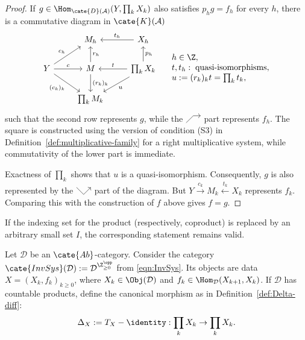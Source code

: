 \begin{proof}
	If $g\in\Hom_{\cate{D}(\mathcal{A})}(Y,\prod_kX_k)$ also satisfies
	$p_hg=f_h$ for every $h$, there is a commutative diagram in
	$\cate{K}(\mathcal{A})$
	\[\begin{tikzcd}
		& M_h & X_h \arrow[l, "t_h"'] \\
		Y \arrow[r, "c"] \arrow[ru, "c_h"] \arrow[rd, "{(c_k)_k}"'] & M \arrow[u, "r_h"'] \arrow[d, "(r_k)_k"] & \prod_k X_k \arrow[l, "t"'] \arrow[u, "p_h"'] \arrow[ld, "u"] \\
		& \prod_k M_k &
	\end{tikzcd} \quad \begin{array}{l}
		h \in \Z, \\
		t, t_h:\;\text{quasi-isomorphisms}, \\
		u := (r_k)_k t = \prod_k t_k ,
	\end{array}\]
	such that the second row represents $g$, while the
	$\begin{tikzpicture}[xscale=0.3, yscale=0.3, baseline=(O)]
		\coordinate (O) at (0, -0.8);
		\draw[->] (0,-1) -- (1, 0) -- (2, 0);
	\end{tikzpicture}$
	part represents $f_h$. The square is constructed using the version of
	condition (S3) in Definition~\ref{def:multiplicative-family} for a right
	multiplicative system, while commutativity of the lower part is immediate.

	Exactness of $\prod_k$ shows that $u$ is a quasi-isomorphism. Consequently,
	$g$ is also represented by the
	$\begin{tikzpicture}[xscale=0.3, yscale=0.3, baseline=(O)]
		\coordinate (O) at (0, -0.8);
		\draw[->] (0,0) -- (1, -1) -- (2, 0);
	\end{tikzpicture}$
	part of the diagram. But $Y\xrightarrow{c_k}M_k\xleftarrow{t_k}X_k$
	represents $f_k$. Comparing this with the construction of $f$ above gives
	$f=g$.
\end{proof}

\begin{remark}
	If the indexing set for the product (respectively, coproduct) is replaced by
	an arbitrary small set $I$, the corresponding statement remains valid.
\end{remark}

Let $\mathcal{D}$ be an $\cate{Ab}$-category. Consider the category
$\cate{InvSys}(\mathcal{D}):=\mathcal{D}^{\Z_{\geq0}^{\opp}}$ from
\eqref{eqn:InvSys}. Its objects are data $X=(X_k,f_k)_{k\geq0}$, where
$X_k\in\Obj(\mathcal{D})$ and
$f_k\in\Hom_{\mathcal{D}}(X_{k+1},X_k)$. If $\mathcal{D}$ has countable
products, define the canonical morphism as in
Definition~\ref{def:Delta-diff}:
	\[ \Delta_X := T_X - \identity: \prod_k X_k \to \prod_k X_k. \]

